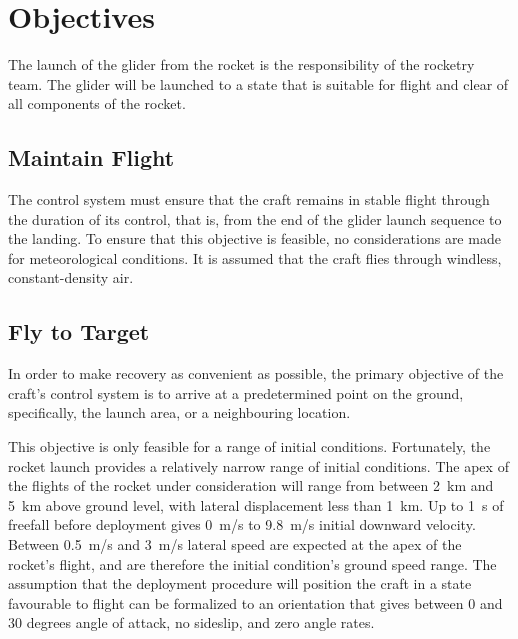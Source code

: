 \documentclass{sydeStyle}
\begin{document}
\chapter{Objectives}

The launch of the glider from the rocket is the responsibility of the rocketry
team. The glider will be launched to a state that is suitable for flight and
clear of all components of the rocket.

\section{Maintain Flight}
\label{sec:obj1}

The control system must ensure that the craft remains in stable flight through
the duration of its control, that is, from the end of the glider launch sequence
to the landing. To ensure that this objective is feasible, no considerations are
made for meteorological conditions. It is assumed that the craft flies through
windless, constant-density air.

\section{Fly to Target}
\label{sec:obj2}

In order to make recovery as convenient as possible, the primary objective of
the craft's control system is to arrive at a predetermined point on the ground,
specifically, the launch area, or a neighbouring location.

This objective is only feasible for a range of initial conditions. Fortunately,
the rocket launch provides a relatively narrow range of initial conditions. The
apex of the flights of the rocket under consideration will range from between
2~km and 5~km above ground level, with lateral displacement less than 1~km. Up
to 1~s of freefall before deployment gives 0~m/s to 9.8~m/s initial downward
velocity. Between 0.5~m/s and 3~m/s lateral speed are expected at the apex of
the rocket's flight, and are therefore the initial condition's ground speed
range. The assumption that the deployment procedure will position the craft in
a state favourable to flight can be formalized to an orientation that gives
between 0 and 30 degrees angle of attack, no sideslip, and zero angle rates.
\end{document}
